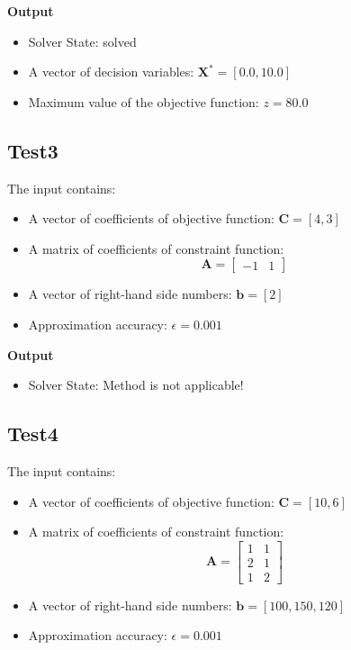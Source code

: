 \documentclass[12pt, legalpaper]{exam}
\begin{document}
\noindent  \textbf{Output}
\begin{itemize}
    \item Solver State: solved
    \item A vector of decision variables: $\mathbf{X^*} = [0.0, 10.0]$
    \item Maximum value of the objective function: $z = 80.0$
\end{itemize}

\vspace{1cm}

\subsection*{Test3}
The input contains:
\begin{itemize}
    \item A vector of coefficients of objective function: $\mathbf{C} = [4, 3]$
    \item A matrix of coefficients of constraint function:
    \[
    \mathbf{A} =
    \begin{bmatrix}
    -1 & 1
    \end{bmatrix}
    \]
    \item A vector of right-hand side numbers: $\mathbf{b} = [2]$
    \item Approximation accuracy: $\epsilon = 0.001$
\end{itemize}

\noindent  \textbf{Output}
\begin{itemize}
    \item Solver State: Method is not applicable!
\end{itemize}

\vspace{1cm}


\subsection*{Test4}
The input contains:
\begin{itemize}
    \item A vector of coefficients of objective function: $\mathbf{C} = [10, 6]$
    \item A matrix of coefficients of constraint function:
    \[
    \mathbf{A} =
    \begin{bmatrix}
    1 & 1 \\
    2 & 1 \\
    1 & 2
    \end{bmatrix}
    \]
    \item A vector of right-hand side numbers: $\mathbf{b} = [100, 150, 120]$
    \item Approximation accuracy: $\epsilon = 0.001$
\end{itemize}
\end{document}
